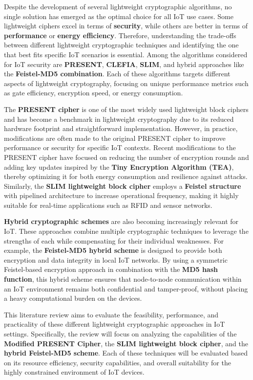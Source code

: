 \documentclass{article}
\begin{document}
Despite the development of several lightweight cryptographic algorithms, no single solution has emerged as the optimal choice for all IoT use cases. Some lightweight ciphers excel in terms of \textbf{security}, while others are better in terms of \textbf{performance} or \textbf{energy efficiency}. Therefore, understanding the trade-offs between different lightweight cryptographic techniques and identifying the one that best fits specific IoT scenarios is essential. Among the algorithms considered for IoT security are \textbf{PRESENT}, \textbf{CLEFIA}, \textbf{SLIM}, and hybrid approaches like the \textbf{Feistel-MD5 combination}. Each of these algorithms targets different aspects of lightweight cryptography, focusing on unique performance metrics such as gate efficiency, encryption speed, or energy consumption.

The \textbf{PRESENT cipher} is one of the most widely used lightweight block ciphers and has become a benchmark in lightweight cryptography due to its reduced hardware footprint and straightforward implementation. However, in practice, modifications are often made to the original PRESENT cipher to improve performance or security for specific IoT contexts. Recent modifications to the PRESENT cipher have focused on reducing the number of encryption rounds and adding key updates inspired by the \textbf{Tiny Encryption Algorithm (TEA)}, thereby optimizing it for both energy consumption and resilience against attacks. Similarly, the \textbf{SLIM lightweight block cipher} employs a \textbf{Feistel structure} with pipelined architecture to increase operational frequency, making it highly suitable for real-time applications such as RFID and sensor networks.

\textbf{Hybrid cryptographic schemes} are also becoming increasingly relevant for IoT. These approaches combine multiple cryptographic techniques to leverage the strengths of each while compensating for their individual weaknesses. For example, the \textbf{Feistel-MD5 hybrid scheme} is designed to provide both encryption and data integrity in local IoT networks. By using a symmetric Feistel-based encryption approach in combination with the \textbf{MD5 hash function}, this hybrid scheme ensures that node-to-node communication within an IoT environment remains both confidential and tamper-proof, without placing a heavy computational burden on the devices.

This literature review aims to evaluate the feasibility, performance, and practicality of these different lightweight cryptographic approaches in IoT settings. Specifically, the review will focus on analyzing the capabilities of the \textbf{Modified PRESENT Cipher}, the \textbf{SLIM lightweight block cipher}, and the \textbf{hybrid Feistel-MD5 scheme}. Each of these techniques will be evaluated based on its resource efficiency, security capabilities, and overall suitability for the highly constrained environment of IoT devices.
\end{document}
